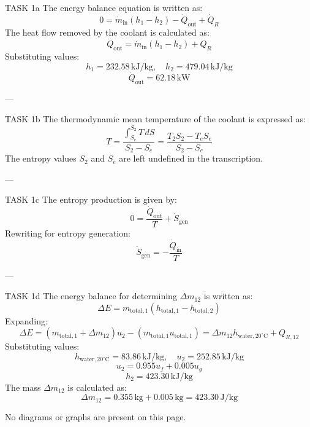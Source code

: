 TASK 1a  
The energy balance equation is written as:  
\[
0 = \dot{m}_{\text{in}} \left( h_1 - h_2 \right) - \dot{Q}_{\text{out}} + \dot{Q}_R
\]  
The heat flow removed by the coolant is calculated as:  
\[
\dot{Q}_{\text{out}} = \dot{m}_{\text{in}} \left( h_1 - h_2 \right) + \dot{Q}_R
\]  
Substituting values:  
\[
h_1 = 232.58 \, \text{kJ/kg}, \quad h_2 = 479.04 \, \text{kJ/kg}
\]  
\[
\dot{Q}_{\text{out}} = 62.18 \, \text{kW}
\]  

---

TASK 1b  
The thermodynamic mean temperature of the coolant is expressed as:  
\[
T = \frac{\int_{S_e}^{S_2} T \, dS}{S_2 - S_e} = \frac{T_2 S_2 - T_e S_e}{S_2 - S_e}
\]  
The entropy values \( S_2 \) and \( S_e \) are left undefined in the transcription.

---

TASK 1c  
The entropy production is given by:  
\[
0 = \frac{\dot{Q}_{\text{out}}}{T} + \dot{S}_{\text{gen}}
\]  
Rewriting for entropy generation:  
\[
\dot{S}_{\text{gen}} = -\frac{\dot{Q}_{\text{in}}}{T}
\]  

---

TASK 1d  
The energy balance for determining \( \Delta m_{12} \) is written as:  
\[
\Delta E = m_{\text{total},1} \left( h_{\text{total},1} - h_{\text{total},2} \right)
\]  
Expanding:  
\[
\Delta E = \left( m_{\text{total},1} + \Delta m_{12} \right) u_2 - \left( m_{\text{total},1} u_{\text{total},1} \right) = \Delta m_{12} h_{\text{water},20^\circ\text{C}} + Q_{R,12}
\]  
Substituting values:  
\[
h_{\text{water},20^\circ\text{C}} = 83.86 \, \text{kJ/kg}, \quad u_2 = 252.85 \, \text{kJ/kg}
\]  
\[
u_2 = 0.955 u_f + 0.005 u_g
\]  
\[
h_2 = 423.30 \, \text{kJ/kg}
\]  
The mass \( \Delta m_{12} \) is calculated as:  
\[
\Delta m_{12} = 0.355 \, \text{kg} + 0.005 \, \text{kg} = 423.30 \, \text{J/kg}
\]  

No diagrams or graphs are present on this page.